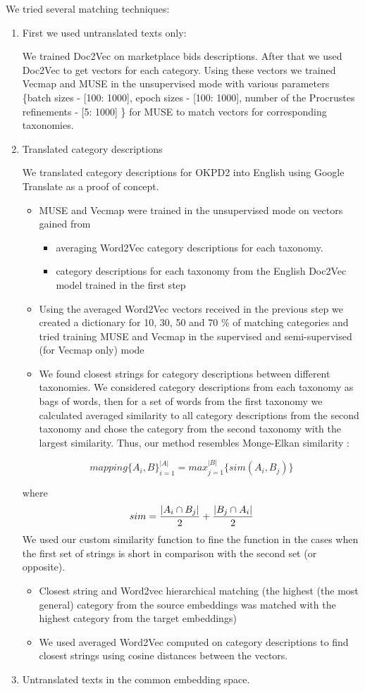 \documentclass[11pt,a4paper]{article}
\begin{document}
We tried several matching techniques:
\begin{enumerate}
	\item First we used untranslated texts only:
	
	We trained Doc2Vec on marketplace bids descriptions. After that we used Doc2Vec to get vectors for each category. Using these vectors we trained Vecmap and MUSE in the unsupervised mode with various parameters \{batch sizes - [100: 1000], epoch sizes - [100: 1000], number of the Procrustes refinements - [5: 1000] \} for MUSE to match vectors for corresponding taxonomies.
	
	\item Translated category descriptions
	
	We translated category descriptions for OKPD2 into English using Google Translate as a proof of concept.
	\begin{itemize}
		\item MUSE and Vecmap were trained in the unsupervised mode on vectors gained from \begin{itemize}
			\item averaging Word2Vec category descriptions for each taxonomy.
			\item category descriptions for each taxonomy from the English Doc2Vec model trained in the first step
		\end{itemize}
		\item Using the averaged Word2Vec vectors received in the previous step we created a dictionary for 10, 30, 50 and 70 \% of matching categories and tried training MUSE and Vecmap in the supervised and semi-supervised (for Vecmap only) mode
		\item We found closest strings for category descriptions between different taxonomies. We considered category descriptions from each taxonomy as bags of words, then for a set of words from the first taxonomy we calculated averaged similarity to all category descriptions from the second taxonomy and chose the category from the second taxonomy with the largest similarity. Thus, our method resembles Monge-Elkan similarity \cite[p.~111]{dupe-detect}:
	\end{itemize}
	
	$$mapping\{A_i, B\}_{i=1}^{|A|} = max_{j=1}^{|B|}\{sim(A_i,B_j)\}$$
	
	where $$sim = \dfrac{|A_i \cap B_j|}{2} + \\ \dfrac{|B_j \cap A_i|}{2} $$
	We used our custom similarity function to fine the function in the cases when the first set of strings is short in comparison with the second set (or opposite).
	\begin{itemize}
		\item Closest string and Word2vec hierarchical matching (the highest (the most general) category from the source embeddings was matched with the highest category from the target embeddings)
		\item We used averaged Word2Vec computed on category descriptions  to find closest strings using cosine distances between the vectors.
	\end{itemize}
	\item Untranslated texts in the common embedding space.
	

\end{enumerate}
\end{document}
